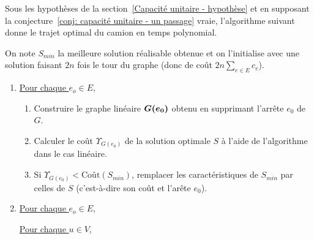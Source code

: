 \begin{thm} \label{thm: capacité unitaire - optimalité}
Sous les hypothèses de la section~\ref{Capacité unitaire - hypothèse} et en supposant la conjecture~\ref{conj: capacité unitaire - un passage} vraie, l'algorithme suivant donne le trajet optimal du camion en temps polynomial.
\end{thm}
On note $S_{min}$ la meilleure solution réalisable obtenue et on l'initialise avec une solution faisant $2n$ fois le tour du graphe (donc de coût $2n\sum_{e \in E}c_e$).
\begin{enumerate}
\item \uline{Pour chaque $e_o \in E$,}
  \begin{enumerate}
  \item Construire le graphe linéaire $\boldsymbol{G(e_0)}$ obtenu en supprimant l'arrête $e_0$ de $G$.
  \item Calculer le coût $\Upsilon_{G(e_0)}$ de la solution optimale $S$ à l'aide de l'algorithme dans le cas linéaire.
  \item Si $\Upsilon_{G(e_0)} < \mbox{Coût}(S_{min})$, remplacer les caractéristiques de $S_{min}$ par celles de $S$ (c'est-à-dire son coût et l'arête $e_0$).
  \end{enumerate}
\item \uline{Pour chaque $e_o \in E$,}

  \uline{Pour chaque $u \in V$,}


\end{enumerate}

